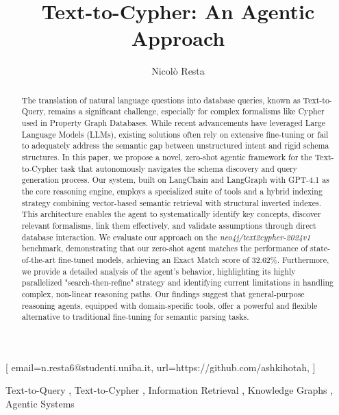 \documentclass[
]{ceurart}
\begin{document}


\title{Text-to-Cypher: An Agentic Approach}

\author[1]{Nicolò Resta}[%
email=n.resta6@studenti.uniba.it,
url=https://github.com/ashkihotah,
]
\address[1]{
  Department of Computer Science, University of Bari Aldo Moro,
  Via E. Orabona, 4, 70125 Bari, Italy
}


\begin{abstract}
  The translation of natural language questions into database queries, known as Text-to-Query, remains a significant challenge, especially for complex formalisms like Cypher used in Property Graph Databases. While recent advancements have leveraged Large Language Models (LLMs), existing solutions often rely on extensive fine-tuning or fail to adequately address the semantic gap between unstructured intent and rigid schema structures. In this paper, we propose a novel, zero-shot agentic framework for the Text-to-Cypher task that autonomously navigates the schema discovery and query generation process. Our system, built on LangChain and LangGraph with GPT-4.1 as the core reasoning engine, employs a specialized suite of tools and a hybrid indexing strategy combining vector-based semantic retrieval with structural inverted indexes. This architecture enables the agent to systematically identify key concepts, discover relevant formalisms, link them effectively, and validate assumptions through direct database interaction. We evaluate our approach on the \textit{neo4j/text2cypher-2024v1} benchmark, demonstrating that our zero-shot agent matches the performance of state-of-the-art fine-tuned models, achieving an Exact Match score of 32.62\%. Furthermore, we provide a detailed analysis of the agent's behavior, highlighting its highly parallelized "search-then-refine" strategy and identifying current limitations in handling complex, non-linear reasoning paths. Our findings suggest that general-purpose reasoning agents, equipped with domain-specific tools, offer a powerful and flexible alternative to traditional fine-tuning for semantic parsing tasks.
\end{abstract}

\begin{keywords}
  Text-to-Query \sep
  Text-to-Cypher \sep
  Information Retrieval \sep
  Knowledge Graphs \sep
  Agentic Systems  
\end{keywords}

\maketitle








\end{document}
